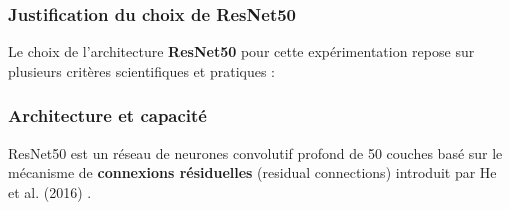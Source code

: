 \subsubsection{Justification du choix de ResNet50}

Le choix de l'architecture \textbf{ResNet50} \cite{he2016deep} pour cette expérimentation repose sur plusieurs critères scientifiques et pratiques :

\subsubsection{Architecture et capacité}

ResNet50 est un réseau de neurones convolutif profond de 50 couches basé sur le mécanisme de \textbf{connexions résiduelles} (residual connections) introduit par He et al. (2016) \cite{he2016deep}.

